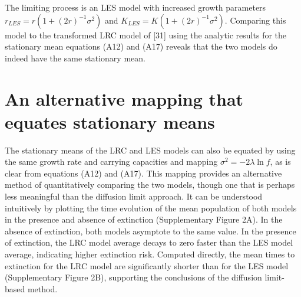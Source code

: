 The limiting process is an LES model with increased growth parameters $r_{LES} = r(1+(2r)^{-1}\sigma^2)$ and $K_{LES} = K(1+(2r)^{-1}\sigma^2)$.  Comparing this model to the transformed LRC model of [31] using the analytic results for the stationary mean equations (A12) and (A17) reveals that the two models do indeed have the same stationary mean.


\section{An alternative mapping that equates stationary means}

The stationary means of the LRC and LES models can also be equated by using the same growth rate and carrying capacities and mapping $\sigma^2 = -2\lambda\ln f$, as is clear from equations (A12) and (A17).  This mapping provides an alternative method of quantitatively comparing the two models, though one that is perhaps less meaningful than the diffusion limit approach.  It can be understood intuitively by plotting the time evolution of the mean population of both models in the presence and absence of extinction (Supplementary Figure 2A).  In the absence of extinction, both models asymptote to the same value.  In the presence of extinction, the LRC model average decays to zero faster than the LES model average, indicating higher extinction risk.  Computed directly, the mean times to extinction for the LRC model are significantly shorter than for the LES model (Supplementary Figure 2B), supporting the conclusions of the diffusion limit-based method.


